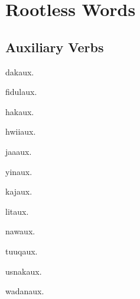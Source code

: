 \chapter{Rootless Words}
\begin{multicols*}{2}
\section{Auxiliary Verbs}
\begin{description}[leftmargin=*]
    \begin{dictentry}{dak}{aux.}
    \end{dictentry}
    \begin{dictentry}{fidul}{aux.}
    \end{dictentry}
    \begin{dictentry}{hak}{aux.}
    \end{dictentry}
    \begin{dictentry}{hwii}{aux.}
    \end{dictentry}
    \begin{dictentry}{jaa}{aux.}
    \end{dictentry}
    \begin{dictentry}{yin}{aux.}
    \end{dictentry}
    \begin{dictentry}{kaj}{aux.}
    \end{dictentry}
    \begin{dictentry}{lit}{aux.}
    \end{dictentry}
    \begin{dictentry}{naw}{aux.}
    \end{dictentry}
    \begin{dictentry}{tuuq}{aux.}
    \end{dictentry}
    \begin{dictentry}{usnak}{aux.}
    \end{dictentry}
    \begin{dictentry}{wadan}{aux.}
    \end{dictentry}
\end{description}


\end{multicols*}
